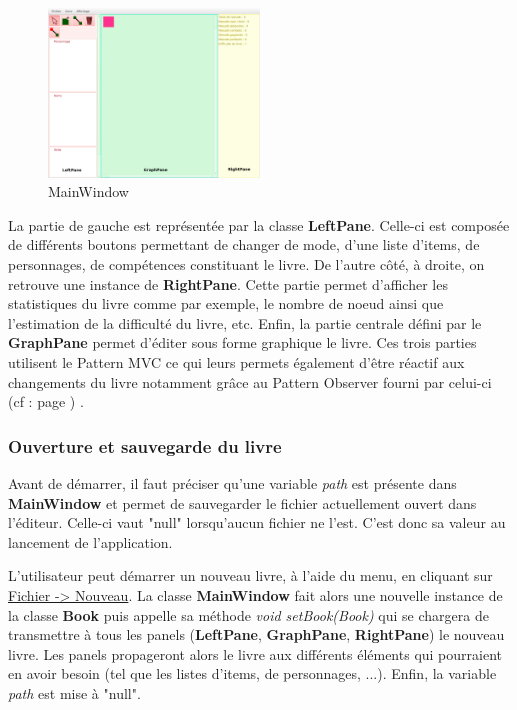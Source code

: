 			\begin{figure}[H]
				\centering\includegraphics[width=0.50\textwidth]{img/mainwindow.png}
				\caption{MainWindow}
				\label{fig:MainWindow}
			\end{figure}

			La partie de gauche est représentée par la classe \textbf{LeftPane}. Celle-ci est composée de différents boutons permettant de changer de mode, d'une liste d'items, de personnages, de compétences constituant le livre. De l'autre côté, à droite, on retrouve une instance de \textbf{RightPane}. Cette partie permet d'afficher les statistiques du livre comme par exemple, le nombre de noeud ainsi que l'estimation de la difficulté du livre, etc. Enfin, la partie centrale défini par le \textbf{GraphPane} permet d'éditer sous forme graphique le livre. Ces trois parties utilisent le Pattern MVC ce qui leurs permets également d'être réactif aux changements du livre notamment grâce au Pattern Observer fourni par celui-ci (cf :  page \pageref{subsec:pattern_observer}) .

			\subsubsection{Ouverture et sauvegarde du livre}

				Avant de démarrer, il faut préciser qu'une variable \textit{path} est présente dans \textbf{MainWindow} et permet de sauvegarder le fichier actuellement ouvert dans l'éditeur. Celle-ci vaut "null" lorsqu'aucun fichier ne l'est. C'est donc sa valeur au lancement de l'application.

				L'utilisateur peut démarrer un nouveau livre, à l'aide du menu, en cliquant sur \underline{Fichier -> Nouveau}. La classe \textbf{MainWindow} fait alors une nouvelle instance de la classe \textbf{Book} puis appelle sa méthode \textit{void setBook(Book)} qui se chargera de transmettre à tous les panels (\textbf{LeftPane}, \textbf{GraphPane}, \textbf{RightPane}) le nouveau livre. Les panels propageront alors le livre aux différents éléments qui pourraient en avoir besoin (tel que les listes d'items, de personnages, ...). Enfin, la variable \textit{path} est mise à "null".

